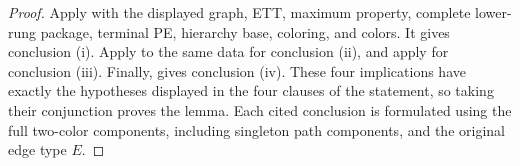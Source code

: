 \begin{proof}
Apply  with the displayed
graph, ETT, maximum property, complete lower-rung package, terminal PE,
hierarchy base, coloring, and colors.  It gives conclusion (i).
Apply  to the same data for
conclusion (ii), and apply  for
conclusion (iii).  Finally,
 gives conclusion (iv).  These four
implications have exactly the hypotheses displayed in the four clauses
of the statement, so taking their conjunction proves the lemma.  Each
cited conclusion is formulated using the full two-color components,
including singleton path components, and the original edge type $E$.
\end{proof}
